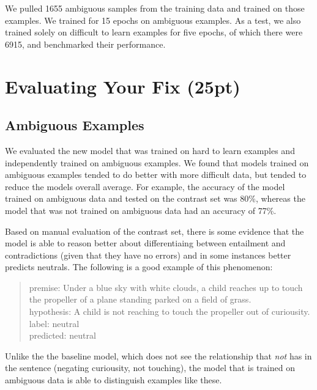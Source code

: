 \documentclass[twocolumn]{article}
\begin{document}
We pulled 1655 ambiguous samples from the training data and trained on those
examples. We trained for 15 epochs on ambiguous examples. As a test, we also
trained solely on difficult to learn examples for five epochs, of which there
were 6915, and benchmarked their performance.

\section{Evaluating Your Fix (25pt)}

\subsection{Ambiguous Examples}

We evaluated the new model that was trained on hard to learn examples and
independently trained on ambiguous examples. We found that models trained on
ambiguous examples tended to do better with more difficult data, but tended to
reduce the models overall average. For example, the accuracy of the model
trained on ambiguous data and tested on the contrast set was 80\%, whereas the
model that was not trained on ambiguous data had an accuracy of 77\%.

Based on manual evaluation of the contrast set, there is some evidence that the
model is able to reason better about differentiaing between entailment and
contradictions (given that they have no errors) and in some instances better
predicts neutrals. The following is a good example of this phenomenon:


\begin{quote}
premise: Under a blue sky with white clouds, a child reaches up to touch the propeller of a plane standing parked on a field of grass. \\
hypothesis: A child is not reaching to touch the propeller out of curiousity.  \\
label: neutral \\
predicted: neutral
\end{quote}

Unlike the the baseline model, which does not see the relationship that
\textit{not} has in the sentence (negating curiousity, not touching), the model
that is trained on ambiguous data is able to distinguish examples like these.
\end{document}
